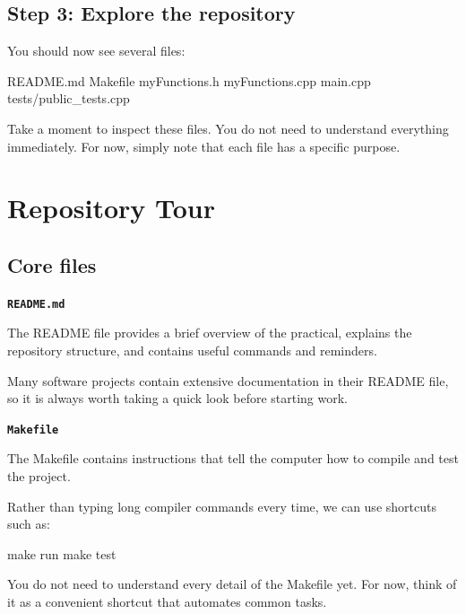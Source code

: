 \documentclass{csc2059practical}
\begin{document}
\subsection{Step 3: Explore the repository}

You should now see several files:

\begin{terminal}
README.md
Makefile
myFunctions.h
myFunctions.cpp
main.cpp
tests/public_tests.cpp
\end{terminal}

Take a moment to inspect these files. You do not need to understand everything immediately. For now, simply note that each file has a specific purpose.

\section{Repository Tour}

\subsection{Core files}

\begin{infobox}
\textbf{\texttt{README.md}}

The README file provides a brief overview of the practical, explains the repository structure, and contains useful commands and reminders.

Many software projects contain extensive documentation in their README file, so it is always worth taking a quick look before starting work.
\end{infobox}

\begin{infobox}
\textbf{\texttt{Makefile}}

The Makefile contains instructions that tell the computer how to compile and test the project.

Rather than typing long compiler commands every time, we can use shortcuts such as:

\begin{bashcode}
make run
make test
\end{bashcode}

You do not need to understand every detail of the Makefile yet. For now, think of it as a convenient shortcut that automates common tasks.
\end{infobox}
\end{document}
